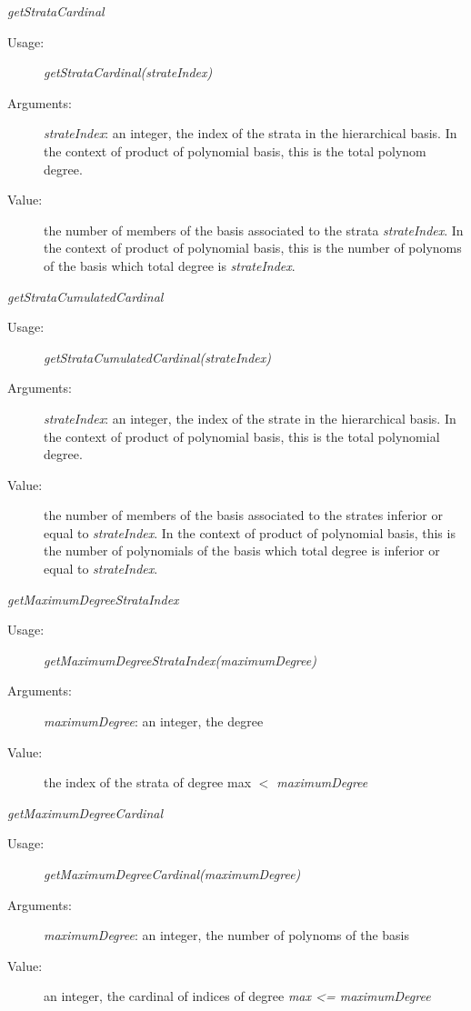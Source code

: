\begin{description}
\begin{description}
\item \textit{getStrataCardinal}
\begin{description}
\item[Usage:] \textit{getStrataCardinal(strateIndex)}
\item[Arguments:] \textit{strateIndex}: an integer, the index of the strata in the hierarchical basis. In the context of product of polynomial basis, this is the total polynom degree.
\item[Value:] the number of members of the basis associated to the strata \textit{strateIndex}. In the context of product of polynomial basis, this is the number of polynoms of the basis which total degree is \textit{strateIndex}.
\end{description}
\bigskip

\item \textit{getStrataCumulatedCardinal}
\begin{description}
\item[Usage:] \textit{getStrataCumulatedCardinal(strateIndex)}
\item[Arguments:] \textit{strateIndex}: an integer, the index of the strate in the hierarchical basis. In the context of product of polynomial basis, this is the total polynomial degree.
\item[Value:] the number of members of the basis associated to the  strates inferior or equal to \textit{strateIndex}. In the context of product of polynomial basis, this is the number of polynomials of the basis which total degree is inferior or equal to \textit{strateIndex}.
\end{description}
\bigskip

\item \textit{getMaximumDegreeStrataIndex}
\begin{description}
\item[Usage:] \textit{getMaximumDegreeStrataIndex(maximumDegree)}
\item[Arguments:] \textit{maximumDegree}: an integer, the degree
\item[Value:] the index of the strata of degree max \textit{$<$ maximumDegree}
\end{description}
\bigskip

\item \textit{getMaximumDegreeCardinal}
\begin{description}
\item[Usage:] \textit{getMaximumDegreeCardinal(maximumDegree)}
\item[Arguments:] \textit{maximumDegree}: an integer, the number of polynoms of the basis
\item[Value:] an integer, the cardinal of indices of degree \textit{max <= maximumDegree}
\end{description}
\bigskip


\end{description}
\end{description}
